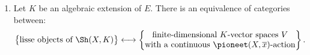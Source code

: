 \begin{theorem}
\begin{enumerate}
        \item Let $K$ be an algebraic extension of $E$. There is an equivalence of categories between:
        \[
        \left\{
        \begin{matrix}
            \text{lisse objects of } \Sh(X, K)
        \end{matrix}
        \right\}
        \longleftrightarrow
        \left\{
        \begin{matrix}
            \text{finite-dimensional } K\text{-vector spaces } V \\
            \text{with a continuous } \pioneet(X, \overline{x})\text{-action}
        \end{matrix}
        \right\}.
        \]
    \end{enumerate}

\end{theorem}